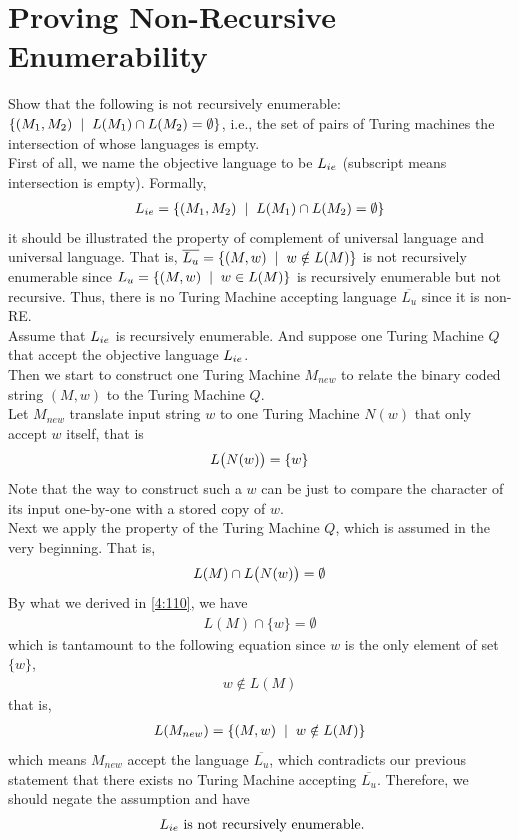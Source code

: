 \documentclass[11pt,a4paper]{article}
\newcommand{\htab}{\hspace*{0.63cm}}
\newcommand{\ba}{\hspace*{0.2cm} | \hspace*{0.2cm}}
\newcommand{\pg}{\\[0.3cm]}
\newcommand{\lu}{L_{u}}
\newcommand{\clu}{\overline{L_{u}} }
\begin{document}
\section{Proving Non-Recursive Enumerability}
Show that the following is not recursively enumerable: $\{(M_{1}, M_{2}) \ba L(M_{1}) \cap L(M_{2}) = \emptyset \}$, i.e., the set
of pairs of Turing machines the intersection of whose languages is empty. \pg
\htab First of all, we name the objective language to be $L_{ie}$ (subscript means intersection is empty). Formally,
\begin{align}
    \lie = \{(M_{1}, M_{2}) \ba L(M_{1}) \cap L(M_{2}) = \emptyset \}
    \end{align}
\htab it should be illustrated the property of complement of universal language and universal language. That is,  $\clu = \{ (M,w) \ba w \notin L(M) \}$ is not recursively enumerable since $\lu = \{ (M,w) \ba w \in L(M)\}$ is recursively enumerable but not recursive. Thus, there is no Turing Machine accepting language $\clu$ since it is non-RE. \\
\htab Assume that $L_{ie}$ is recursively enumerable. And suppose one Turing Machine $Q$ that accept the objective language $L_{ie}$. \\
\htab Then we start to construct one Turing Machine $M_{new}$ to relate the binary coded string $(M,w)$ to 
the Turing Machine $Q$. \\
\htab Let $M_{new}$ translate input string $w$ to one Turing Machine $N(w)$ that only accept $w$ itself, that is
\begin{align}
    L\big(N(w)\big) = \{ w \} \label{4:110}
    \end{align}
\htab Note that the way to construct such a $w$ can be just to compare the character of its input 
 one-by-one with a stored copy of $w$. \\
\htab Next we apply the property of the Turing Machine $Q$, which is assumed in the very beginning. That is,
\begin{align}
    L(M) \cap L\big(N(w)\big) = \emptyset
    \end{align}
\htab By what we derived in \eqref{4:110}, we have
\begin{align}
    L(M) \cap \{w\} = \emptyset
    \end{align}
    \htab which is tantamount to the following equation since $w$ is the only element of set $\{w\}$,
\begin{align}
    w \notin L(M)
    \end{align}
\htab that is,
\begin{align}
    L(M_{new}) = \{ (M, w) \ba w \notin L(M) \}
    \end{align}
\htab which means $M_{new}$ accept the language $\clu$, which contradicts our previous statement that
there exists no Turing Machine accepting $\clu$. Therefore, we should negate the assumption and have
\begin{align}
    \text{ $L_{ie}$ is not recursively enumerable}.
   \end{align}
\newpage 
\newcommand{\x}[1]{x_{#1}}
\newcommand{\n}[1]{\overset{-}{x_{#1}} }
\end{document}
